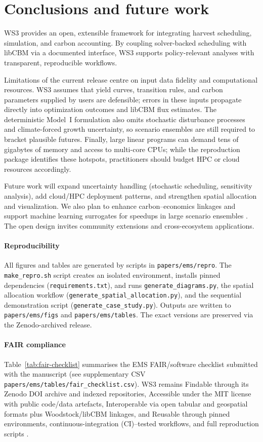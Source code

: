 \documentclass[review]{elsarticle}
\begin{document}
\section{Conclusions and future work}
WS3 provides an open, extensible framework for integrating harvest scheduling, simulation, and carbon accounting. By coupling solver-backed scheduling with libCBM via a documented interface, WS3 supports policy-relevant analyses with transparent, reproducible workflows.

Limitations of the current release centre on input data fidelity and computational resources. WS3 assumes that yield curves, transition rules, and carbon parameters supplied by users are defensible; errors in these inputs propagate directly into optimization outcomes and libCBM flux estimates. The deterministic Model~I formulation also omits stochastic disturbance processes and climate-forced growth uncertainty, so scenario ensembles are still required to bracket plausible futures. Finally, large linear programs can demand tens of gigabytes of memory and access to multi-core CPUs; while the reproduction package identifies these hotspots, practitioners should budget HPC or cloud resources accordingly.

Future work will expand uncertainty handling (stochastic scheduling, sensitivity analysis), add cloud/HPC deployment patterns, and strengthen spatial allocation and visualization. We also plan to enhance carbon–economics linkages and support machine learning surrogates for speedups in large scenario ensembles \citep{forrester2008surrogatemodelling}. The open design invites community extensions and cross-ecosystem applications.

\paragraph{Reproducibility}
All figures and tables are generated by scripts in \texttt{papers/ems/repro}. The \texttt{make\_repro.sh} script creates an isolated environment, installs pinned dependencies (\texttt{requirements.txt}), and runs \texttt{generate\_diagrams.py}, the spatial allocation workflow (\texttt{generate\_spatial\_allocation.py}), and the sequential demonstration script (\texttt{generate\_case\_study.py}). Outputs are written to \texttt{papers/ems/figs} and \texttt{papers/ems/tables}. The exact versions are preserved via the Zenodo-archived release.

\paragraph{FAIR compliance}
Table~\ref{tab:fair-checklist} summarises the EMS FAIR/software checklist submitted with the manuscript (see supplementary CSV \texttt{papers/ems/tables/fair\_checklist.csv}). WS3 remains Findable through its Zenodo DOI archive and indexed repositories, Accessible under the MIT license with public code/data artefacts, Interoperable via open tabular and geospatial formats plus Woodstock/libCBM linkages, and Reusable through pinned environments, continuous-integration (CI)–tested workflows, and full reproduction scripts \citep{ws3_zenodo2025}.
\end{document}
